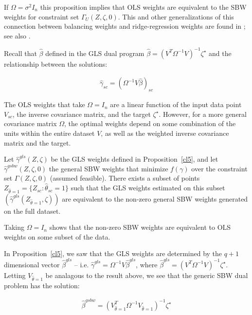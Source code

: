 \begin{remark}
    If $\Omega = \sigma^2I_n$ this proposition implies that OLS weights are equivalent to the SBW weights for constraint set $\Gamma_U(Z, \zeta, 0)$. This and other generalizations of this connection between balancing weights and ridge-regression weights are found in \cite{ben2021augmented}; see also \cite{chattopadhyay2021implied}.
\end{remark}

\begin{remark}\label{rmk:olsweightsfixed}
    Recall that $\hat{\beta}$ defined in the GLS dual program $\hat{\beta} = (V^T\Omega^{-1}V)^{-1}\zeta^\star$ and the relationship between the solutions: 
    
    \begin{align*}
        \hat{\gamma}_{sc} = (\Omega^{-1}V\hat{\beta})_{sc}
    \end{align*}

    The OLS weights that take $\Omega = I_n$ are a linear function of the input data point $V_{sc}$, the inverse covariance matrix, and the target $\zeta^\star$. However, for a more general covariance matrix $\Omega$, the optimal weights depend on some combination of the units within the entire dataset $V$, as well as the weighted inverse covariance matrix and the target. 
\end{remark}

\begin{proposition}\label{cl6}
    Let $\hat{\gamma}^{gls}(Z, \zeta)$ be the GLS weights defined in Proposition~\ref{cl5}, and let $\hat{\gamma}^{gsbw}(Z, \zeta, 0)$  the general SBW weights that minimize $f(\gamma)$ over the constraint set $\Gamma(Z, \zeta, 0)$ (assumed feasible). There exists a subset of points $Z_{\hat{\theta} = 1} = \{Z_{sc}: \hat{\theta}_{sc} = 1\}$ such that the GLS weights estimated on this subset $(\hat{\gamma}^{gls}(Z_{\hat{\theta} = 1}, \zeta))$ are equivalent to the non-zero general SBW weights generated on the full dataset.
\end{proposition}

\begin{remark}
    Taking $\Omega = I_n$ shows that the non-zero SBW weights are equivalent to OLS weights on some subset of the data. 
\end{remark}

\begin{remark}
    In Proposition~\ref{cl5}, we saw that the GLS weights are determined by the $q + 1$ dimensional vector $\hat{\beta}^{gls}$ -- i.e. $\hat{\gamma}^{gls} = \Omega^{-1}V\hat{\beta}^{gls}$, where $\hat{\beta}^{gls} = (V^T\Omega^{-1}V)^{-1}\zeta^\star$. Letting $V_{\hat{\theta}=1}$ be analagous to the result above, we see that the generic SBW dual problem has the solution:
    
    \begin{align}
    \hat{\beta}^{gsbw} = (V_{\hat{\theta}=1}^T\Omega^{-1}V_{\hat{\theta}=1})^{-1}\zeta^\star
    \end{align}
\end{remark}

